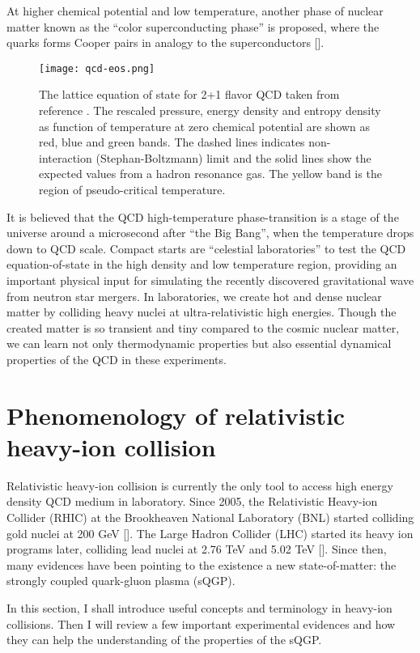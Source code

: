 At higher chemical potential and low temperature, another phase of nuclear matter known as the ``color superconducting phase'' is proposed, where the quarks forms Cooper pairs in analogy to the superconductors [].

\begin{figure}
    \centering
    \texttt{[image: qcd-eos.png]}
    \caption{The lattice equation of state for 2+1 flavor QCD taken from reference \cite{Bazavov:2014pvz}. The rescaled pressure, energy density and entropy density as function of temperature at zero chemical potential are shown as red, blue and green bands. The dashed lines indicates non-interaction (Stephan-Boltzmann) limit and the solid lines show the expected values from a hadron resonance gas. The yellow band is the region of pseudo-critical temperature.}
    \label{fig:qcd_eos}
\end{figure}

It is believed that the QCD high-temperature phase-transition is a stage of the universe around a microsecond after ``the Big Bang'', when the temperature drops down to QCD scale.
Compact starts are ``celestial laboratories'' to test the QCD equation-of-state in the high density and low temperature region, providing an important physical input for simulating the recently discovered gravitational wave from neutron star mergers.
In laboratories, we create hot and dense nuclear matter by colliding heavy nuclei at ultra-relativistic high energies.
Though the created matter is so transient and tiny compared to the cosmic nuclear matter, we can learn not only thermodynamic properties but also essential dynamical properties of the QCD in these experiments.

\section{Phenomenology of relativistic heavy-ion collision}
Relativistic heavy-ion collision is currently the only tool to access high energy density QCD medium in laboratory.
Since 2005, the Relativistic Heavy-ion Collider (RHIC) at the Brookheaven National Laboratory (BNL) started colliding gold nuclei at 200 GeV []. 
The Large Hadron Collider (LHC) started its heavy ion programs later, colliding lead nuclei at 2.76 TeV and 5.02 TeV [].
Since then, many evidences have been pointing to the existence a new state-of-matter: the strongly coupled quark-gluon plasma (sQGP).

In this section, I shall introduce useful concepts and terminology in heavy-ion collisions.
Then I will review a few important experimental evidences and how they can help the understanding of the properties of the sQGP.

